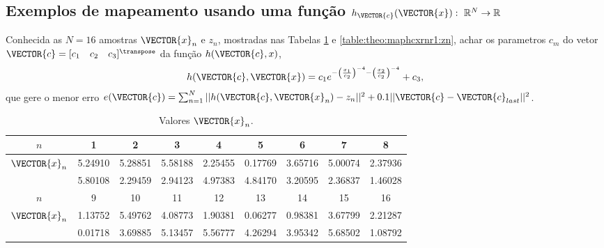
\subsection{Exemplos de mapeamento usando uma função
$h_{\VECTOR{c}}(\VECTOR{x}):~\mathbb{R}^N \rightarrow \mathbb{R}$}

\begin{example}\label{ex:theo:maphcxrnr1}
Conhecida as $N=16$ amostras $\VECTOR{x}_n$ e $z_n$, mostradas nas  Tabelas \ref{table:theo:maphcxrnr1:xn} e \ref{table:theo:maphcxrnr1:zn},
achar os parametros $c_m$ do vetor $\VECTOR{c}=[c_1\quad c_2\quad c_3]^{\transpose}$ da função $h(\VECTOR{c},x)$, 
\begin{equation}
h(\VECTOR{c},\VECTOR{x})=c_1 e^{-\left(\frac{x_1}{c_2}\right)^{-4}-\left(\frac{x_2}{c_2}\right)^{-4}}+c_3,
\end{equation}
que gere o menor erro 
$e(\VECTOR{c})=\sum_{n=1}^{N} ||h(\VECTOR{c},\VECTOR{x}_n)-z_n||^2 + 0.1 ||\VECTOR{c}-\VECTOR{c}_{last}||^2$.
\end{example}


\begin{table}[h!]
\centering
\begin{tabular}{|c|c|c|c|c|c|c|c|c|} 
 \hline
$n$   & 1 & 2 & 3 & 4 & 5 & 6 & 7 & 8\\ \hline
$\VECTOR{x}_n$ & 5.24910 & 5.28851 & 5.58188 & 2.25455 & 0.17769 & 3.65716 & 5.00074 & 2.37936 \\ 
             ~ & 5.80108 & 2.29459 & 2.94123 & 4.97383 & 4.84170 & 3.20595 & 2.36837 & 1.46028 \\ \hline
 \hline
$n$   & 9 & 10 & 11 & 12 & 13 & 14 & 15 & 16\\  \hline
$\VECTOR{x}_n$ & 1.13752 & 5.49762 & 4.08773 & 1.90381 & 0.06277 & 0.98381 & 3.67799 & 2.21287 \\
             ~ & 0.01718 & 3.69885 & 5.13457 & 5.56777 & 4.26294 & 3.95342 & 5.68502 & 1.08792 \\ \hline
\end{tabular}
\caption{Valores $\VECTOR{x}_n$.}
\label{table:theo:maphcxrnr1:xn}
\end{table}

